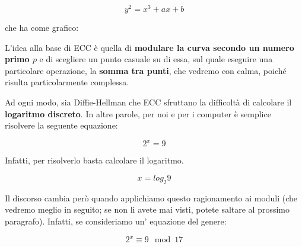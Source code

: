 \documentclass{rapport}
\begin{document}
\begin{equation*}
    y^2 = x^3 + ax + b    
\end{equation*}

che ha come grafico:


\begin{figure}[h!]
\centering
{}
\end{figure}

L'idea alla base di ECC è quella di \textbf{modulare la curva secondo un numero primo $p$} e di scegliere un punto casuale su di essa, sul quale eseguire una particolare operazione, la \textbf{somma tra punti}, che vedremo con calma, poiché risulta particolarmente complessa.

Ad ogni modo, sia Diffie-Hellman che ECC sfruttano la difficoltà di calcolare il \textbf{logaritmo discreto}. In altre parole, per noi e per i computer è semplice risolvere la seguente equazione:

\begin{equation*}
    2 ^ x = 9
\end{equation*}

Infatti, per risolverlo basta calcolare il logaritmo.

\begin{equation*}
    x = log _ {2} 9
\end{equation*}

\newpage

Il discorso cambia però quando applichiamo questo ragionamento ai moduli (che vedremo meglio in seguito; se non li avete mai visti, potete saltare al prossimo paragrafo). Infatti, se consideriamo un' equazione del genere:

\begin{equation*}
    2 ^ x \equiv 9 \mod 17
\end{equation*}
\end{document}
